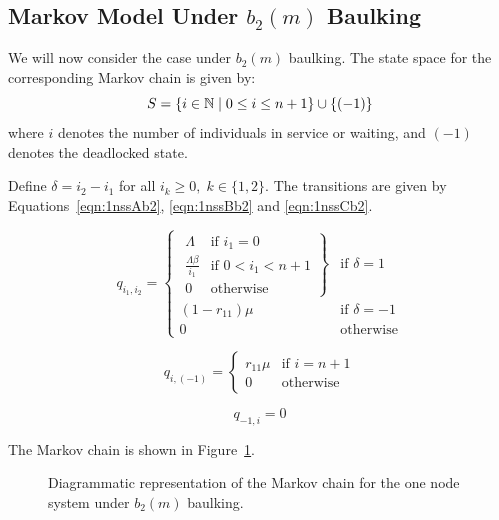 \documentclass{article}
\begin{document}
\subsection{Markov Model Under $b_2(m)$ Baulking}

We will now consider the case under $b_2(m)$ baulking.
The state space for the corresponding Markov chain is given by:
        \[S = \{i\in\mathbb{N} \nonscript\; | \nonscript\; 0 \leq i \leq n + 1
        \}\cup\{(-1)\}\]
where \(i\) denotes the number of individuals in service or waiting, and $(-1)$ denotes the deadlocked state.

Define  $\delta = i_2 - i_1$ for all $i_k \geq 0,\; k \in \{1, 2\}$.
The transitions are given by Equations~\ref{eqn:1nssAb2}, \ref{eqn:1nssBb2} and \ref{eqn:1nssCb2}.

\begin{equation}\label{eqn:1nssAb2}
  q_{i_1, i_2} = \left\{
  \begin{array}{rr}
    \left. \begin{array}{rr}
      \Lambda & \text{if } i_1 = 0 \\
      \frac{\Lambda \beta}{i_1} & \text{if } 0 < i_1 < n + 1 \\
      0 & \text{otherwise}
    \end{array} \right\} & \text{if } \delta = 1 \\
    (1 - r_{11})\mu & \text{if } \delta = -1 \\
    0 & \text{otherwise}
  \end{array} \right.
\end{equation}

\begin{equation}\label{eqn:1nssBb2}
  q_{i, (-1)} = \left\{
  \begin{array}{rr}
    r_{11}\mu & \text{if } i = n + 1 \\
    0 & \text{otherwise}
  \end{array}
  \right.
\end{equation}

\begin{equation}\label{eqn:1nssCb2}
  q_{-1, i} = 0
\end{equation}

The Markov chain is shown in Figure~\ref{fig:1nodeMCbaulking2}.

\begin{figure}[!hbtp]
  \begin{center}
    
  \end{center}
  \caption{Diagrammatic representation of the Markov chain for the one node system under $b_2(m)$ baulking.}
  \label{fig:1nodeMCbaulking2}
\end{figure}
\end{document}
